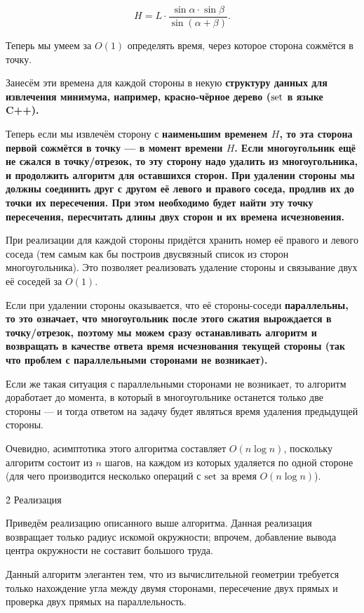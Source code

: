 $$ H = L \cdot \frac{ \sin \alpha \cdot \sin \beta }{ \sin (\alpha + \beta) }. $$

Теперь мы умеем за $O(1)$ определять время, через которое сторона сожмётся в точку.

Занесём эти времена для каждой стороны в некую \bf{структуру данных для извлечения минимума}, например, красно-чёрное дерево ($\rm set$ в языке C++).

Теперь если мы извлечём сторону с \bf{наименьшим временем $H$}, то эта сторона первой сожмётся в точку --- в момент времени $H$. Если многоугольник ещё не сжался в точку/отрезок, то эту сторону надо \bf{удалить} из многоугольника, и продолжить алгоритм для оставшихся сторон. При удалении стороны мы должны \bf{соединить} друг с другом её левого и правого соседа, \bf{продлив} их до точки их пересечения. При этом необходимо будет найти эту точку пересечения, пересчитать длины двух сторон и их времена исчезновения.

При реализации для каждой стороны придётся хранить номер её правого и левого соседа (тем самым как бы построив двусвязный список из сторон многоугольника). Это позволяет реализовать удаление стороны и связывание двух её соседей за $O(1)$.

Если при удалении стороны оказывается, что её стороны-соседи \bf{параллельны}, то это означает, что многоугольник после этого сжатия вырождается в точку/отрезок, поэтому мы можем сразу останавливать алгоритм и возвращать в качестве ответа время исчезнования текущей стороны (так что проблем с параллельными сторонами не возникает).

Если же такая ситуация с параллельными сторонами не возникает, то алгоритм доработает до момента, в который в многоугольнике останется только две стороны --- и тогда ответом на задачу будет являться время удаления предыдущей стороны.

Очевидно, асимптотика этого алгоритма составляет $O (n \log n)$, поскольку алгоритм состоит из $n$ шагов, на каждом из которых удаляется по одной стороне (для чего производится несколько операций с $\rm set$ за время $O (n \log n)$).


\h2{ Реализация }

Приведём реализацию описанного выше алгоритма. Данная реализация возвращает только радиус искомой окружности; впрочем, добавление вывода центра окружности не составит большого труда.

Данный алгоритм элегантен тем, что из вычислительной геометрии требуется только нахождение угла между двумя сторонами, пересечение двух прямых и проверка двух прямых на параллельность.


